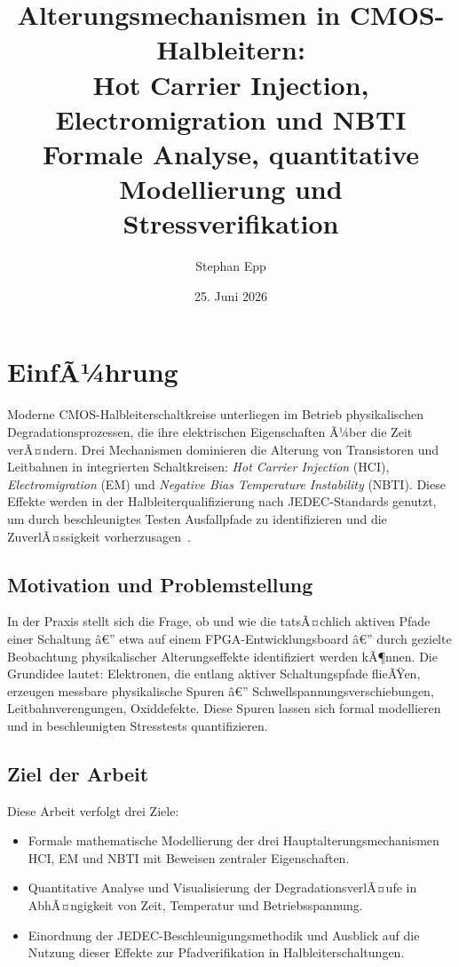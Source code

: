 ﻿\documentclass[a4paper,12pt]{article}
\title{Alterungsmechanismen in CMOS-Halbleitern:\\
Hot Carrier Injection, Electromigration und NBTI\\\large
Formale Analyse, quantitative Modellierung und Stressverifikation}
\author{Stephan Epp}
\date{25. Juni 2026}
\theoremstyle{definition}
\begin{document}
\sloppy
\setlength{\emergencystretch}{3em}

\maketitle
\tableofcontents
\newpage

\section{EinfÃ¼hrung}

Moderne CMOS-Halbleiterschaltkreise unterliegen im Betrieb physikalischen
Degradationsprozessen, die ihre elektrischen Eigenschaften Ã¼ber die Zeit
verÃ¤ndern. Drei Mechanismen dominieren die Alterung von
Transistoren und Leitbahnen in integrierten Schaltkreisen:
\emph{Hot Carrier Injection} (HCI), \emph{Electromigration} (EM) und
\emph{Negative Bias Temperature Instability} (NBTI). Diese Effekte werden
in der Halbleiterqualifizierung nach JEDEC-Standards genutzt, um durch
beschleunigtes Testen Ausfallpfade zu identifizieren und die ZuverlÃ¤ssigkeit
vorherzusagen~\cite{jedec2010,black1969,takeda1983}.

\subsection{Motivation und Problemstellung}

In der Praxis stellt sich die Frage, ob und wie die tatsÃ¤chlich aktiven Pfade
einer Schaltung â€” etwa auf einem FPGA-Entwicklungsboard â€” durch gezielte
Beobachtung physikalischer Alterungseffekte identifiziert werden kÃ¶nnen.
Die Grundidee lautet: Elektronen, die entlang aktiver Schaltungspfade flieÃŸen,
erzeugen messbare physikalische Spuren â€” Schwellspannungsverschiebungen,
Leitbahnverengungen, Oxiddefekte. Diese Spuren lassen sich formal modellieren
und in beschleunigten Stresstests quantifizieren.

\subsection{Ziel der Arbeit}

Diese Arbeit verfolgt drei Ziele:
\begin{itemize}
	\item Formale mathematische Modellierung der drei Hauptalterungsmechanismen
	      HCI, EM und NBTI mit Beweisen zentraler Eigenschaften.
	\item Quantitative Analyse und Visualisierung der DegradationsverlÃ¤ufe
	      in AbhÃ¤ngigkeit von Zeit, Temperatur und Betriebsspannung.
	\item Einordnung der JEDEC-Beschleunigungsmethodik und Ausblick auf
	      die Nutzung dieser Effekte zur Pfadverifikation in Halbleiterschaltungen.
\end{itemize}
\end{document}
